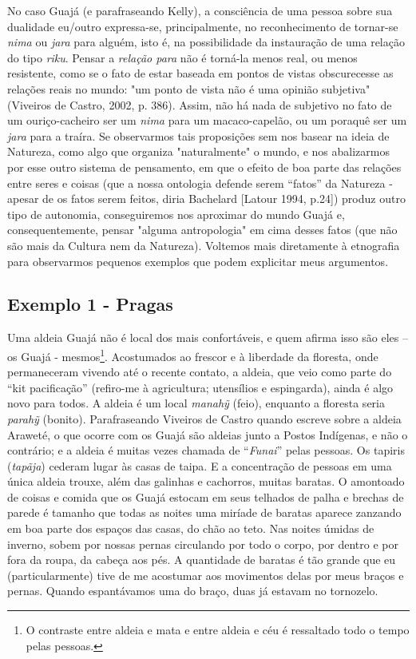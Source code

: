 No caso Guajá (e parafraseando Kelly), a consciência de uma pessoa sobre
sua dualidade eu/outro expressa-se, principalmente, no reconhecimento de
tornar-se \emph{nima} ou \emph{jara} para alguém, isto é, na
possibilidade da instauração de uma relação do tipo \emph{riku}. Pensar
a \emph{relação para} não é torná-la menos real, ou menos resistente,
como se o fato de estar baseada em pontos de vistas obscurecesse as
relações reais no mundo: "um ponto de vista não é uma opinião subjetiva"
(Viveiros de Castro, 2002, p. 386). Assim, não há nada de subjetivo no
fato de um ouriço-cacheiro ser um \emph{nima} para um macaco-capelão, ou
um poraquê ser um \emph{jara} para a traíra. Se observarmos tais
proposições sem nos basear na ideia de Natureza, como algo que organiza
"naturalmente" o mundo, e nos abalizarmos por esse outro sistema de
pensamento, em que o efeito de boa parte das relações entre seres e
coisas (que a nossa ontologia defende serem ``fatos'' da Natureza -
apesar de os fatos serem feitos, diria Bachelard {[}Latour 1994,
p.24{]}) produz outro tipo de autonomia, conseguiremos nos aproximar do
mundo Guajá e, consequentemente, pensar "alguma antropologia" em cima
desses fatos (que não são mais da Cultura nem da Natureza). Voltemos
mais diretamente à etnografia para observarmos pequenos exemplos que
podem explicitar meus argumentos.

\subsection{Exemplo 1 - Pragas}

Uma aldeia Guajá não é local dos mais confortáveis, e quem afirma isso
são eles -- os Guajá - mesmos\footnote{O contraste entre aldeia e mata e
  entre aldeia e céu é ressaltado todo o tempo pelas pessoas.}.
Acostumados ao frescor e à liberdade da floresta, onde permaneceram
vivendo até o recente contato, a aldeia, que veio como parte do ``kit
pacificação'' (refiro-me à agricultura; utensílios e espingarda), ainda
é algo novo para todos. A aldeia é um local \emph{manahỹ} (feio),
enquanto a floresta seria \emph{parahỹ} (bonito). Parafraseando Viveiros
de Castro quando escreve sobre a aldeia Araweté, o que ocorre com os
Guajá são aldeias junto a Postos Indígenas, e não o contrário; e a
aldeia é muitas vezes chamada de ``\emph{Funai}'' pelas pessoas. Os
tapiris (\emph{tapãja}) cederam lugar às casas de taipa. E a
concentração de pessoas em uma única aldeia trouxe, além das galinhas e
cachorros, muitas baratas. O amontoado de coisas e comida que os Guajá
estocam em seus telhados de palha e brechas de parede é tamanho que
todas as noites uma miríade de baratas aparece zanzando em boa parte dos
espaços das casas, do chão ao teto. Nas noites úmidas de inverno, sobem
por nossas pernas circulando por todo o corpo, por dentro e por fora da
roupa, da cabeça aos pés. A quantidade de baratas é tão grande que eu
(particularmente) tive de me acostumar aos movimentos delas por meus
braços e pernas. Quando espantávamos uma do braço, duas já estavam no
tornozelo.

